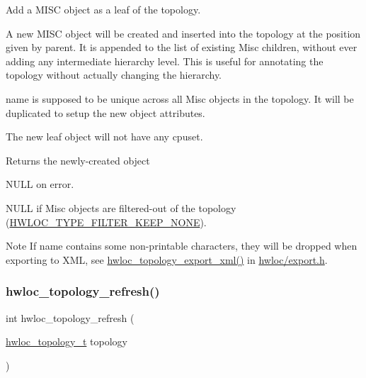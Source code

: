Add a M\+I\+SC object as a leaf of the topology. 

A new M\+I\+SC object will be created and inserted into the topology at the position given by parent. It is appended to the list of existing Misc children, without ever adding any intermediate hierarchy level. This is useful for annotating the topology without actually changing the hierarchy.

{\ttfamily name} is supposed to be unique across all Misc objects in the topology. It will be duplicated to setup the new object attributes.

The new leaf object will not have any {\ttfamily cpuset}.

\begin{DoxyReturn}{Returns}
the newly-\/created object

{\ttfamily N\+U\+LL} on error.

{\ttfamily N\+U\+LL} if Misc objects are filtered-\/out of the topology (\hyperlink{a00193_gga9a5a1f0140cd1952544477833733195ba4f835955414de92c77d99b8419d4647a}{H\+W\+L\+O\+C\+\_\+\+T\+Y\+P\+E\+\_\+\+F\+I\+L\+T\+E\+R\+\_\+\+K\+E\+E\+P\+\_\+\+N\+O\+NE}).
\end{DoxyReturn}
\begin{DoxyNote}{Note}
If {\ttfamily name} contains some non-\/printable characters, they will be dropped when exporting to X\+ML, see \hyperlink{a00206_ga333f79975b4eeb28a3d8fad3373583ce}{hwloc\+\_\+topology\+\_\+export\+\_\+xml()} in \hyperlink{a00128_source}{hwloc/export.\+h}. 
\end{DoxyNote}
\mbox{\label{a00194_ga698ecd640d2b76742bba3829a145cd9a}} 
\subsubsection{\texorpdfstring{hwloc\+\_\+topology\+\_\+refresh()}{hwloc\_topology\_refresh()}}
{\footnotesize\ttfamily int hwloc\+\_\+topology\+\_\+refresh (\begin{DoxyParamCaption}\item[{\hyperlink{a00186_ga9d1e76ee15a7dee158b786c30b6a6e38}{hwloc\+\_\+topology\+\_\+t}}]{topology }\end{DoxyParamCaption})}




